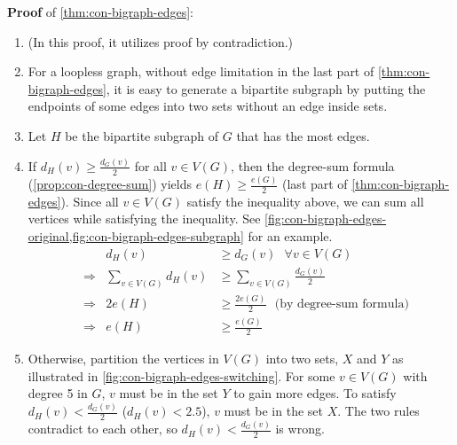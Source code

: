 \documentclass[../src/handouts/main.tex]{subfiles}
\begin{document}
\textbf{Proof} of \cref{thm:con-bigraph-edges}:
\begin{enumerate}
  \item (In this proof, it utilizes proof by contradiction.)
  \item For a loopless graph, without edge limitation in the last part of \cref{thm:con-bigraph-edges}, it is easy to generate a bipartite subgraph by putting the endpoints of some edges into two sets without an edge inside sets.
  \item Let $H$ be the bipartite subgraph of $G$ that has the most edges.
  \item If $d_H(v) \geq \frac{d_G(v)}{2}$ for all $v \in V(G)$, then the degree-sum formula (\cref{prop:con-degree-sum}) yields $e(H) \geq \frac{e(G)}{2}$ (last part of \cref{thm:con-bigraph-edges}). Since all $v \in V(G)$ satisfy the inequality above, we can sum all vertices while satisfying the inequality. See \cref{fig:con-bigraph-edges-original,fig:con-bigraph-edges-subgraph} for an example.
    \begin{align*}
       &             & d_H(v)                    & \geq d_G(v) \ \ \ \forall v \in V(G)                       \\
       & \Rightarrow & \sum _{v \in V(G)} d_H(v) & \geq \sum _{v \in V(G)} \frac{d_G(v)}{2}                   \\
       & \Rightarrow & 2 e(H)                    & \geq \frac{2 e(G)}{2} \ \ \ \text{(by degree-sum formula)} \\
       & \Rightarrow & e(H)                      & \geq \frac{e(G)}{2}
    \end{align*}
  \item Otherwise, partition the vertices in $V(G)$ into two sets, $X$ and $Y$ as illustrated in \cref{fig:con-bigraph-edges-switching}. For some $v \in V(G)$ with degree 5 in $G$, $v$ must be in the set $Y$ to gain more edges. To satisfy $d_H(v) < \frac{d_G(v)}{2}$ ($d_H(v) < 2.5$), $v$ must be in the set $X$. The two rules contradict to each other, so $d_H(v) < \frac{d_G(v)}{2}$ is wrong.
\end{enumerate}
\end{document}
